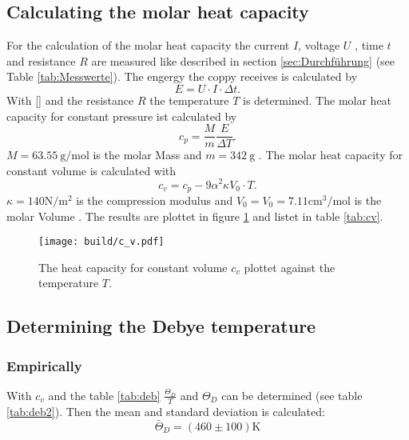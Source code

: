 \subsection{Calculating the molar heat capacity}
For the calculation of the molar heat capacity 
the current $I$, voltage $U$ , time $t$ and resistance $R$ are measured 
like described in section \ref{sec:Durchführung} (see Table \ref{tab:Messwerte}).
\newline \newline
\noindent The engergy the coppy receives is calculated by 
\begin{equation}
    E = U \cdot I \cdot \Delta t .
\end{equation}
\noindent With \eqref{} and the resistance $R$ the temperature $T$ is determined.
The molar heat capacity for constant pressure ist calculated by
\begin{equation}
    c_p = \frac{ M}{m} \frac{E}{\Delta T}.
\end{equation}
\noindent $M = \SI{63.55}{\g\per\mole}$ is the molar Mass and
$m= \SI{342}{\g}$ \cite{Molmasse_kupfer}\cite{V47}.
The molar heat capacity for constant volume is calculated with 
\begin{equation}
    c_v = c_p - 9 \alpha^2 \kappa V_0 \cdot T.
\end{equation}
\noindent $\kappa = 140 \si{\N\per\square\m}$ is the compression modulus \cite{kappa_kupfer}
and $V_0 = V_0 =  7.11 \si{\cubic\cm\per\mole} $ is the molar Volume \cite{V0_kupfer}.
The results are plottet in figure \ref{fig:cv} and listet in table \ref{tab:cv}.

\begin{figure}
    \centering 
    \texttt{[image: build/c\_v.pdf]}
    \caption{The heat capacity for constant volume $c_v$ plottet against the temperature $T$.}
    \label{fig:cv}
\end{figure}

\subsection{Determining the Debye temperature}
\subsubsection{Empirically}
With $c_v$ and the table \ref{tab:deb}
$\frac{\Theta_D}{T}$ and $\Theta_D$ can be determined (see table \ref{tab:deb2}).
Then the mean and standard deviation is calculated:
\begin{equation*}
    \bar{\Theta}_D =  (460 \pm 100) \si{\kelvin}
\end{equation*}

